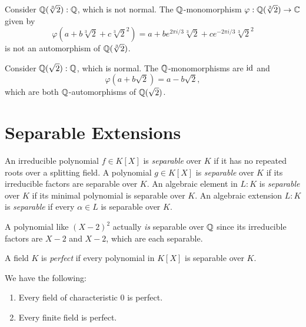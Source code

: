 \begin{example}
  Consider $\mathbb{Q}(\sqrt[3]{2}) : \mathbb{Q}$, which is not normal.
  The $\mathbb{Q}$-monomorphism $\varphi : \mathbb{Q}(\sqrt[3]{2}) \to \mathbb{C}$
  given by
  \[
    \varphi(a + b\sqrt[3]{2} + c\sqrt[3]{2}^2) = a + be^{2\pi i / 3} \sqrt[3]{2} + ce^{-2\pi i / 3} \sqrt[3]{2}^2
  \]
  is not an automorphism of $\mathbb{Q}(\sqrt[3]{2})$.
\end{example}

\begin{example}
  Consider $\mathbb{Q}(\sqrt{2}) : \mathbb{Q}$, which is normal. The
  $\mathbb{Q}$-monomorphisms are $\mathrm{id}$ and
  \[\varphi(a + b\sqrt{2}) = a - b\sqrt{2},\]
  which are both $\mathbb{Q}$-automorphisms of $\mathbb{Q}(\sqrt{2})$.
\end{example}

\section{Separable Extensions}

\begin{definition}
  An irreducible polynomial $f \in K[X]$ is
  \emph{separable} over $K$ if it has no repeated roots
  over a splitting field. A polynomial $g \in K[X]$ is
  \emph{separable} over $K$ if its irreducible factors
  are separable over $K$. An algebraic element in $L : K$
  is \emph{separable} over $K$ if its minimal polynomial
  is separable over $K$. An algebraic extension $L : K$
  is \emph{separable} if every $\alpha \in L$ is separable
  over $K$.
\end{definition}

\begin{remark}
  A polynomial like $(X - 2)^2$ actually \emph{is}
  separable
  over $\mathbb{Q}$ since its irreducible factors are
  $X - 2$ and $X - 2$, which are each separable.
\end{remark}

\begin{definition}
  A field $K$ is \emph{perfect} if every polynomial
  in $K[X]$ is separable over $K$.
\end{definition}

\begin{theorem}
  We have the following:
  \begin{enumerate}
    \item Every field of characteristic $0$ is perfect.
    \item Every finite field is perfect.
  \end{enumerate}
\end{theorem}

